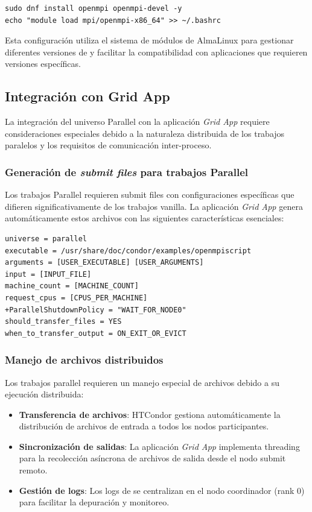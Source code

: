 \begin{verbatim}
sudo dnf install openmpi openmpi-devel -y
echo "module load mpi/openmpi-x86_64" >> ~/.bashrc
\end{verbatim}

Esta configuración utiliza el sistema de módulos de AlmaLinux para gestionar diferentes versiones de \MPI y facilitar la compatibilidad con aplicaciones que requieren versiones específicas.

\subsection{Integración con Grid App}
\noindent

La integración del universo Parallel con la aplicación \textit{Grid App} requiere consideraciones especiales debido a la naturaleza distribuida de los trabajos paralelos y los requisitos de comunicación inter-proceso.

\subsubsection{Generación de \textit{submit files} para trabajos Parallel}
\noindent

Los trabajos Parallel requieren submit files con configuraciones específicas que difieren significativamente de los trabajos vanilla. La aplicación \textit{Grid App} genera automáticamente estos archivos con las siguientes características esenciales:

\begin{verbatim}
universe = parallel
executable = /usr/share/doc/condor/examples/openmpiscript
arguments = [USER_EXECUTABLE] [USER_ARGUMENTS]
input = [INPUT_FILE]
machine_count = [MACHINE_COUNT]
request_cpus = [CPUS_PER_MACHINE]
+ParallelShutdownPolicy = "WAIT_FOR_NODE0"
should_transfer_files = YES
when_to_transfer_output = ON_EXIT_OR_EVICT
\end{verbatim}

\subsubsection{Manejo de archivos distribuidos}
\noindent

Los trabajos parallel requieren un manejo especial de archivos debido a su ejecución distribuida:

\begin{itemize}
	\item \textbf{Transferencia de archivos}: HTCondor gestiona automáticamente la distribución de archivos de entrada a todos los nodos participantes.

	\item \textbf{Sincronización de salidas}: La aplicación \textit{Grid App} implementa threading para la recolección asíncrona de archivos de salida desde el nodo submit remoto.

	\item \textbf{Gestión de logs}: Los logs de \MPI se centralizan en el nodo coordinador (rank 0) para facilitar la depuración y monitoreo.
\end{itemize}

